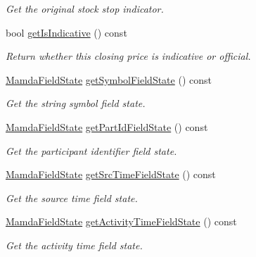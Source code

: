 \begin{CompactItemize}
\begin{CompactList}\small\item\em Get the original stock stop indicator. \item\end{CompactList}\item 
bool \hyperlink{classWombat_1_1MamdaTradeListener_4fdf4fec41a6f66b7acd2be40a7c4e03}{get\-Is\-Indicative} () const 
\begin{CompactList}\small\item\em Return whether this closing price is indicative or official. \item\end{CompactList}\item 
\hyperlink{namespaceWombat_93aac974f2ab713554fd12a1fa3b7d2a}{Mamda\-Field\-State} \hyperlink{classWombat_1_1MamdaTradeListener_ddcc8f4fae7a6d944ccc4021fd5ac492}{get\-Symbol\-Field\-State} () const 
\begin{CompactList}\small\item\em Get the string symbol field state. \item\end{CompactList}\item 
\hyperlink{namespaceWombat_93aac974f2ab713554fd12a1fa3b7d2a}{Mamda\-Field\-State} \hyperlink{classWombat_1_1MamdaTradeListener_0ebdcf5fd43af5725690bf4ed5bdf0d1}{get\-Part\-Id\-Field\-State} () const 
\begin{CompactList}\small\item\em Get the participant identifier field state. \item\end{CompactList}\item 
\hyperlink{namespaceWombat_93aac974f2ab713554fd12a1fa3b7d2a}{Mamda\-Field\-State} \hyperlink{classWombat_1_1MamdaTradeListener_a228f95b1fd47f62b1d57e88c6b6482a}{get\-Src\-Time\-Field\-State} () const 
\begin{CompactList}\small\item\em Get the source time field state. \item\end{CompactList}\item 
\hyperlink{namespaceWombat_93aac974f2ab713554fd12a1fa3b7d2a}{Mamda\-Field\-State} \hyperlink{classWombat_1_1MamdaTradeListener_a43ecdb29f836cb0176ca473515de915}{get\-Activity\-Time\-Field\-State} () const 
\begin{CompactList}\small\item\em Get the activity time field state. \item\end{CompactList}\item 

\end{CompactItemize}
